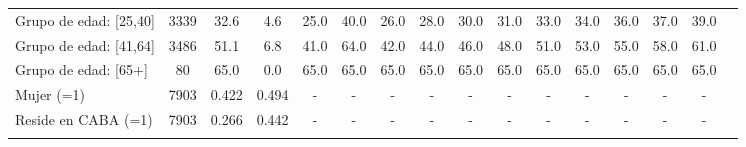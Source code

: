 \begin{tabular}{l*{15}{c}}
\hspace{0.25cm}  Grupo de edad: [25,40] & 3339 &  32.6 &   4.6 &  25.0 &  40.0 &  26.0 &  28.0 &  30.0 &  31.0 &  33.0 &  34.0 &  36.0 &  37.0 &  39.0 \\
\hspace{0.25cm}  Grupo de edad: [41,64] & 3486 &  51.1 &   6.8 &  41.0 &  64.0 &  42.0 &  44.0 &  46.0 &  48.0 &  51.0 &  53.0 &  55.0 &  58.0 &  61.0 \\
\hspace{0.25cm}  Grupo de edad: [65+] & 80 &  65.0 &   0.0 &  65.0 &  65.0 &  65.0 &  65.0 &  65.0 &  65.0 &  65.0 &  65.0 &  65.0 &  65.0 &  65.0 \\
Mujer (=1) & 7903 & 0.422 & 0.494 & - & - & - & - & - & - & - & - & - & - & - \\
Reside en CABA (=1) & 7903 & 0.266 & 0.442 & - & - & - & - & - & - & - & - & - & - & - \\
\hline\hline \multicolumn{15}{p{20cm}}{}\\ 
\end{tabular}